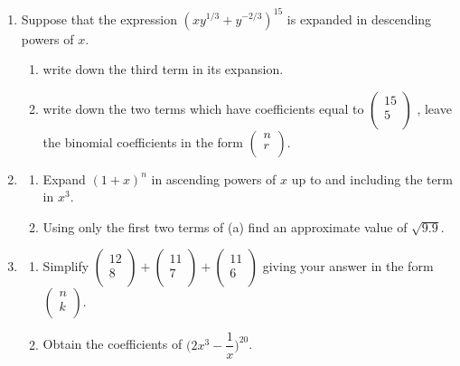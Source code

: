 \documentclass[11pt,a4paper]{article}
\begin{document}
\begin{enumerate}
\item
Suppose that the expression $(xy^{1/3}+y^{-2/3})^{15}$ is expanded in descending powers of $x$.
\begin{enumerate}
       \item write down the third term in its expansion.
       \item write down the two terms which have coefficients equal to $
\begin{pmatrix}
15\\5\\
\end{pmatrix}              
$ , leave the binomial coefficients in the form $
\begin{pmatrix}
n\\r\\
\end{pmatrix}
$.\\       
\end{enumerate}

\item
\begin{enumerate}
      \item Expand $(1+x)^n$ in ascending powers of $x$ up to and including the term in $x^3$.
      \item Using only the first two terms of (a) find an approximate value of $\sqrt{9.9}$.\\
\end{enumerate}



\item
\begin{enumerate}
      \item Simplify $
\begin{pmatrix}
12\\8\\
\end{pmatrix}
+
\begin{pmatrix}
11\\7\\
\end{pmatrix} 
+
\begin{pmatrix}
11\\6\\
\end{pmatrix}     
$ giving your answer in the form $
\begin{pmatrix}
n\\k\\
\end{pmatrix}
$.
      \item Obtain the coefficients of $\bigg(2x^3-\dfrac{1}{x}\bigg)^{20}$.\\
\end{enumerate}


\end{enumerate}
\end{document}
